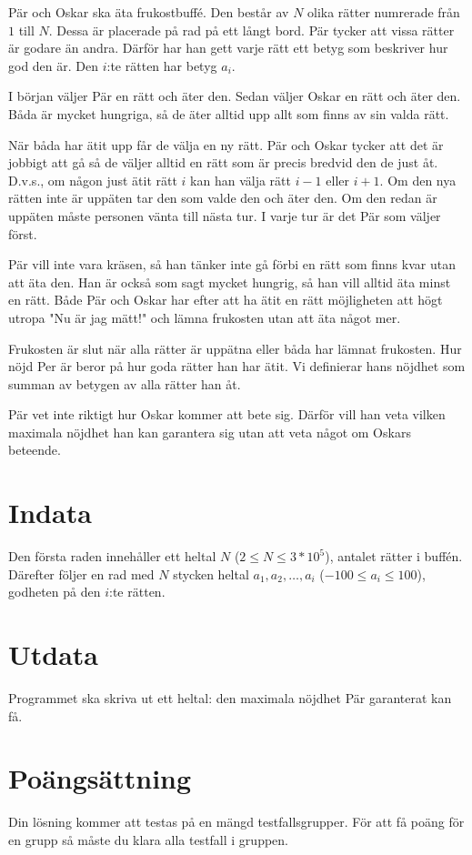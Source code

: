 Pär och Oskar ska äta frukostbuffé.
Den består av $N$ olika rätter numrerade från $1$ till $N$.
Dessa är placerade på rad på ett långt bord.
Pär tycker att vissa rätter är godare än andra.
Därför har han gett varje rätt ett betyg som beskriver hur god den är.
Den $i$:te rätten har betyg $a_i$.

I början väljer Pär en rätt och äter den. Sedan väljer Oskar en rätt och äter den.
Båda är mycket hungriga, så de äter alltid upp allt som finns av sin valda rätt.

När båda har ätit upp får de välja en ny rätt.
Pär och Oskar tycker att det är jobbigt att gå så de väljer alltid en rätt som är precis bredvid den de just åt.
D.v.s., om någon just ätit rätt $i$ kan han välja rätt $i-1$ eller $i+1$.
Om den nya rätten inte är uppäten tar den som valde den och äter den.
Om den redan är uppäten måste personen vänta till nästa tur.
I varje tur är det Pär som väljer först.

Pär vill inte vara kräsen, så han tänker inte gå förbi en rätt som finns kvar utan att äta den.
Han är också som sagt mycket hungrig, så han vill alltid äta minst en rätt.
Både Pär och Oskar har efter att ha ätit en rätt möjligheten att högt utropa "Nu är jag mätt!" och lämna frukosten utan att äta något mer.

Frukosten är slut när alla rätter är uppätna eller båda har lämnat frukosten.
Hur nöjd Per är beror på hur goda rätter han har ätit.
Vi definierar hans nöjdhet som summan av betygen av alla rätter han åt.

Pär vet inte riktigt hur Oskar kommer att bete sig.
Därför vill han veta vilken maximala nöjdhet han kan garantera sig utan att veta något om Oskars beteende.

\section*{Indata}
Den första raden innehåller ett heltal $N$ ($2 \leq N \leq 3*10^5$), antalet rätter i buffén.
Därefter följer en rad med $N$ stycken heltal $a_1, a_2, \ldots, a_i$ ($-100 \leq a_i \leq 100$), godheten på den $i$:te rätten.

\section*{Utdata}
Programmet ska skriva ut ett heltal: den maximala nöjdhet Pär garanterat kan få.

\section*{Poängsättning}
Din lösning kommer att testas på en mängd testfallsgrupper. För att få poäng för en grupp så måste du klara alla testfall i gruppen.

